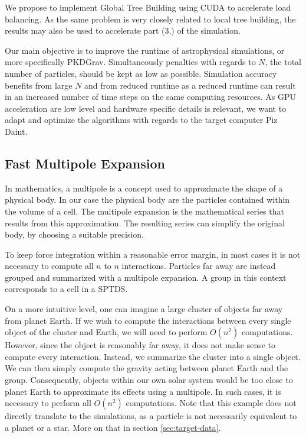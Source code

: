 \documentclass[]{article}
\begin{document}
We propose to implement Global Tree Building using CUDA to accelerate load balancing. As the same problem is very closely related to local tree building, the results may also be used to accelerate part (3.) of the simulation. 

Our main objective is to improve the runtime of astrophysical simulations, or more specifically PKDGrav. Simultaneously penalties with regards to $N$, the total number of particles, should be kept as low as possible. Simulation accuracy benefits from large $N$ and from reduced runtime as a reduced runtime can result in an increased number of time steps on the same computing resources. As GPU acceleration are low level and hardware specific details is relevant, we want to adapt and optimize the algorithms with regards to the target computer Piz Daint.


\subsection{Fast Multipole Expansion} \label{sec:multipole}

In mathematics, a multipole is a concept used to approximate the shape of a physical body. In our case the physical body are the particles contained within the volume of a cell. The multipole expansion is the mathematical series that results from this approximation. The resulting series can simplify the original body, by choosing a suitable precision.

To keep force integration within a reasonable error margin, in most cases it is not necessary to compute all $n$ to $n$ interactions. Particles far away are instead grouped and summarized with a multipole expansion. A group in this context corresponds to a cell in a SPTDS.

On a more intuitive level, one can imagine a large cluster of objects far away from planet Earth. If we wish to compute the interactions between every single object of the cluster and Earth, we will need to perform $O(n^2)$ computations. However, since the object is reasonably far away, it does not make sense to compute every interaction. Instead, we summarize the cluster into a single object. We can then simply compute the gravity acting between planet Earth and the group. Consequently, objects within our own solar system would be too close to planet Earth to approximate its effects using a multipole. In such cases, it is necessary to perform all $O(n^2)$ computations.
Note that this example does not directly translate to the simulations, as a particle is not necessarily equivalent to a planet or a star. More on that in section \ref{sec:target-data}.
\end{document}
